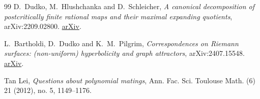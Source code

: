 \documentclass[11pt,a4paper,oneside,openany]{book}
\theoremstyle{definition}
\theoremstyle{remark}
\begin{document}
\begin{thebibliography}{99}
D.~Dudko, M.~Hlushchanka and D.~Schleicher,
\emph{A canonical decomposition of postcritically finite rational maps and their maximal expanding quotients}, arXiv:2209.02800.
\href{https://arxiv.org/abs/2209.02800}{arXiv}.

L.~Bartholdi, D.~Dudko and K.~M.~Pilgrim,
\emph{Correspondences on Riemann surfaces: (non-uniform) hyperbolicity and graph attractors}, arXiv:2407.15548.
\href{https://arxiv.org/abs/2407.15548}{arXiv}.

Tan Lei,
\emph{Questions about polynomial matings}, Ann. Fac. Sci. Toulouse Math. (6) 21 (2012), no. 5, 1149--1176.

\end{thebibliography}
\end{document}
